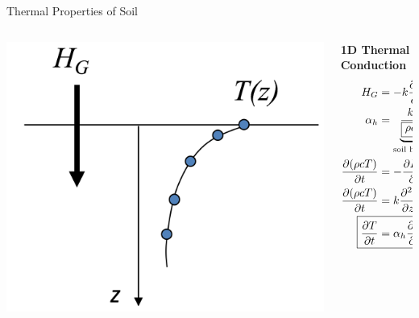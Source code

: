 
\begin{frame}{Thermal Properties of Soil}
\begin{columns}[T]
    \begin{column}{.45\textwidth}
    \begin{minipage}[c][0.8\textheight][c]{\linewidth}
    \includegraphics[width=1\textwidth]{fig5.png}
    \end{minipage}
    \end{column}
    \begin{column}{.55\textwidth}
    \begin{minipage}[c][0.8\textheight][c]{\linewidth}
    {\large \textbf{1D Thermal Conduction}}
    \begin{align*}
    	H_G &= -k\frac{\partial T}{\partial z}\quad \parbox{8em}{Fourier's \\conduction law}\\
    	\alpha_h &= \underbrace{\frac{k}{\boxed{\rho c}} = \frac{k}{\boxed{C}}}_{\text{soil heat capacity}}\\
    	\frac{\partial (\rho cT)}{\partial t} &= -\frac{\partial H_G}{\partial z}\\
    	\frac{\partial (\rho cT)}{\partial t} &= k\frac{\partial^2 T}{\partial z^2}\\
    	\Aboxed{\frac{\partial T}{\partial t} &= \alpha_h\frac{\partial^2 T}{\partial z^2}}
    \end{align*}
      \end{minipage}
    \end{column}
  \end{columns} 
\end{frame}
